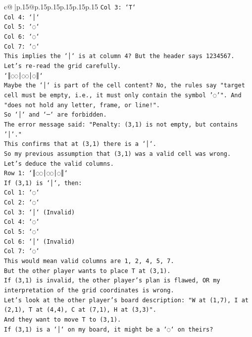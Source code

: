 \documentclass{article}
\begin{document}
{\begin{supertabular}{c@{$\;$}|p{.15\linewidth}@{}p{.15\linewidth}p{.15\linewidth}p{.15\linewidth}p{.15\linewidth}p{.15\linewidth}}
{{{\texttt{Col 3: `T`} \\
\texttt{Col 4: `│`} \\
\texttt{Col 5: `◌`} \\
\texttt{Col 6: `◌`} \\
\texttt{Col 7: `◌`} \\
\texttt{This implies the `│` is at column 4? But the header says 1234567.} \\
\texttt{Let's re{-}read the grid carefully.} \\
\texttt{`║◌◌│◌◌│◌║`} \\
\texttt{Maybe the `│` is part of the cell content? No, the rules say "target cell must be empty, i.e., it must only contain the symbol '◌'". And "does not hold any letter, frame, or line!".} \\
\texttt{So `│` and `─` are forbidden.} \\
\texttt{The error message said: "Penalty: (3,1) is not empty, but contains '│'."} \\
\texttt{This confirms that at (3,1) there is a `│`.} \\
\texttt{So my previous assumption that (3,1) was a valid cell was wrong.} \\
\texttt{Let's deduce the valid columns.} \\
\texttt{Row 1: `║◌◌│◌◌│◌║`} \\
\texttt{If (3,1) is `│`, then:} \\
\texttt{Col 1: `◌`} \\
\texttt{Col 2: `◌`} \\
\texttt{Col 3: `│` (Invalid)} \\
\texttt{Col 4: `◌`} \\
\texttt{Col 5: `◌`} \\
\texttt{Col 6: `│` (Invalid)} \\
\texttt{Col 7: `◌`} \\
\texttt{This would mean valid columns are 1, 2, 4, 5, 7.} \\
\texttt{But the other player wants to place T at (3,1).} \\
\texttt{If (3,1) is invalid, the other player's plan is flawed, OR my interpretation of the grid coordinates is wrong.} \\
\texttt{Let's look at the other player's board description: "W at (1,7), I at (2,1), T at (4,4), C at (7,1), H at (3,3)".} \\
\texttt{And they want to move T to (3,1).} \\
\texttt{If (3,1) is a `│` on my board, it might be a `◌` on theirs?} \\
}}}
\end{supertabular}}
\end{document}

